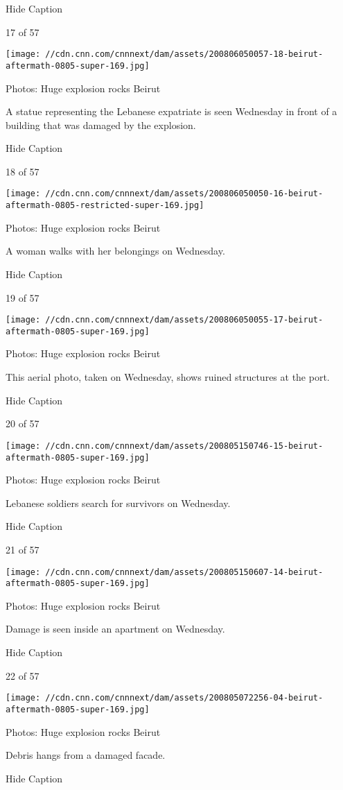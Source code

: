 Hide Caption

17 of 57

\texttt{[image: //cdn.cnn.com/cnnnext/dam/assets/200806050057-18-beirut-aftermath-0805-super-169.jpg]}

Photos: Huge explosion rocks Beirut

A statue representing the Lebanese expatriate is seen Wednesday in front
of a building that was damaged by the explosion.

Hide Caption

18 of 57

\texttt{[image: //cdn.cnn.com/cnnnext/dam/assets/200806050050-16-beirut-aftermath-0805-restricted-super-169.jpg]}

Photos: Huge explosion rocks Beirut

A woman walks with her belongings on Wednesday.

Hide Caption

19 of 57

\texttt{[image: //cdn.cnn.com/cnnnext/dam/assets/200806050055-17-beirut-aftermath-0805-super-169.jpg]}

Photos: Huge explosion rocks Beirut

This aerial photo, taken on Wednesday, shows ruined structures at the
port.

Hide Caption

20 of 57

\texttt{[image: //cdn.cnn.com/cnnnext/dam/assets/200805150746-15-beirut-aftermath-0805-super-169.jpg]}

Photos: Huge explosion rocks Beirut

Lebanese soldiers search for survivors on Wednesday.

Hide Caption

21 of 57

\texttt{[image: //cdn.cnn.com/cnnnext/dam/assets/200805150607-14-beirut-aftermath-0805-super-169.jpg]}

Photos: Huge explosion rocks Beirut

Damage is seen inside an apartment on Wednesday.

Hide Caption

22 of 57

\texttt{[image: //cdn.cnn.com/cnnnext/dam/assets/200805072256-04-beirut-aftermath-0805-super-169.jpg]}

Photos: Huge explosion rocks Beirut

Debris hangs from a damaged facade.

Hide Caption

